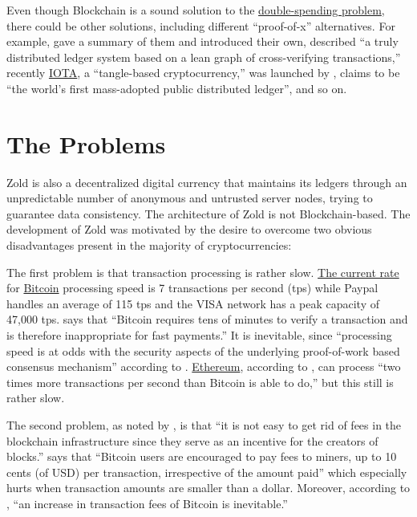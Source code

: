 \documentclass{main}
\begin{document}
Even though Blockchain is a sound solution to the
\href{https://en.wikipedia.org/wiki/Double-spending}{double-spending problem},
there could be other solutions,
including different ``proof-of-x'' alternatives.
For example,  gave
a summary of them and introduced their own,
 described
``a truly distributed ledger system based on a lean graph of cross-verifying transactions,''
recently \href{https://www.iota.org/}{IOTA}, a ``tangle-based cryptocurrency,'' was launched by
,
 claims to be ``the world's first mass-adopted public distributed ledger'',
and so on.

\pagebreak

\section*{The Problems}

Zold is also a decentralized digital currency that maintains its ledgers
through an unpredictable number of anonymous and untrusted server nodes, trying to guarantee
data consistency. The architecture of Zold is not Blockchain-based.
The development of Zold was motivated by the desire to overcome
two obvious disadvantages present in the majority of cryptocurrencies:

The first problem is that transaction processing is rather slow.
\href{https://goo.gl/sWiAWc}{The current rate} for \href{https://bitcoin.org/}{Bitcoin}
processing speed is 7 transactions per second (tps)
while Paypal handles an average of 115 tps and the VISA
network has a peak capacity of 47,000 tps.
 says that
``Bitcoin requires tens of minutes to verify a transaction
and is therefore inappropriate for fast payments.''
It is inevitable, since
``processing speed is at odds with the security aspects of the underlying
proof-of-work based consensus mechanism'' according
to .
\href{https://ethereum.org/}{Ethereum}, according to , can process
``two times more transactions per second than Bitcoin is able to do,''
but this still is rather slow.

The second problem, as noted by ,
is that ``it is not easy to get rid
of fees in the blockchain infrastructure since they serve
as an incentive for the creators of blocks.''
 says that ``Bitcoin users are encouraged to
pay fees to miners, up to 10 cents (of USD) per transaction, irrespective of the
amount paid'' which especially hurts when transaction amounts are smaller than a dollar.
Moreover, according to ,
``an increase in transaction fees of Bitcoin is inevitable.''
\end{document}

